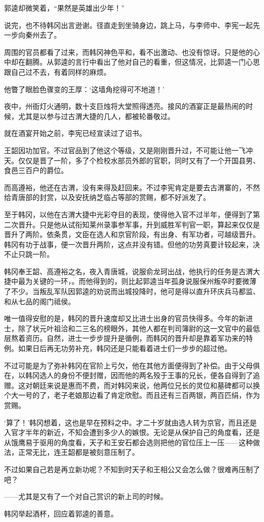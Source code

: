 郭逵却微笑着，“果然是英雄出少年！”

说完，也不待韩冈出言逊谢。径直走到坐骑身边，跳上马，与李师中、李宪一起先一步向秦州去了。

周围的官员都看了过来，而韩冈神色平和，看不出激动、也没有惊讶。只是他的心中却在翻腾。从郭逵的言行中看出了他对自己的看重，但这情况，比郭逵一门心思跟自己过不去，有着同样的麻烦。

他瞥了眼脸色骤变的王厚：‘这墙角挖得可不地道！’

夜中，州衙灯火通明，数十支巨烛将大堂照得透亮。接风的酒宴正是最热闹的时候，尤其是以参与过古渭大捷的几人，都被轮番敬过。

就在酒宴开始之前，李宪已经宣读过了诏书。

王韶因功加官。不过官品到了他这个等级，又是刚刚晋升过，不可能让他一飞冲天。仅仅是晋了一阶，多了个检校水部员外郎的官职，同时又有了一个开国县男、食邑三百户的爵位。

而高遵裕，他还在古渭，没有来得及赶回来。不过李宪肯定是要去古渭寨的，不然给青唐部的封赏，以及安抚纳芝临占等部的赏赐，都不好派发了。

至于韩冈，以他在古渭大捷中光彩夺目的表现，使得他入官不过半年，便得到了第二次晋升。只是他从试衔知莱州录事参军事，升到威胜军判官一职，算起来仅仅是晋升了两阶。依条贯，文臣在选人和京官阶段，有出身、有军功者，可越级晋升。韩冈有功于战事，便一次晋升两阶，这点并没有错。但他的功劳真要计较起来，决不止只跳一阶。

韩冈奉王韶、高遵裕之名，夜入青唐城，说服俞龙珂出战，他执行的任务是古渭大捷中最为关键的一环，。而他得到的，则比起郭逵当年孤身说服保州叛卒时要微薄了不少。当叛乱军队因郭逵的劝说而出城投降时，他可是得以直升环庆兵马都监、和从七品的阁门祗侯。

唯一值得安慰的是，韩冈的晋升速度却又比进士出身的官员快得多。今年的新进士，除了状元叶祖洽和二三名的榜眼外，其他人都在判司簿尉的这一文官中的最低层熬着资历。自然，进士一步步提升是循例，而韩冈的晋升却是靠着军功来的特例。如果日后再无功劳补充，韩冈还是只能看着进士们一步步的超过他。

不过可能是为了弥补韩冈在官阶上亏欠，他在其他方面便得到了补偿。由于父母俱在，以韩冈选人的身份不便封赠，因而他的两名殁于王事的兄长，便各自得到了追赠。这对朝廷来说是惠而不费，而对韩冈来说，他两位兄长的灵位和墓碑都可以换个大一号的了，老子老娘那边看了肯定欣慰。而且还有三百两银，两百匹绢，作为赏赐。

‘算了！’韩冈想着，这也是早在预料之中。才二十岁就由选人转为京官，而且还是入官才半年的新近，不知会遭到多少人的嫉恨。无论是从保护自己的角度看，还是从饿鹰易于驱用的角度看，天子和王安石都会选则把他的官位压上一压——这种做法，正常无比，连王韶都是被刻意压制了。

不过如果自己若是再立新功呢？不知到时天子和王相公又会怎么做？很难再压制了吧？

——尤其是又有了一个对自己赏识的新上司的时候。

韩冈举起酒杯，回应着郭逵的善意。

